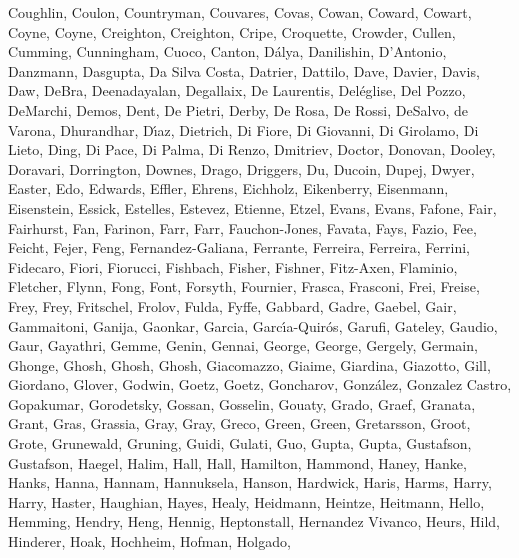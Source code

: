 \documentclass[times,tight]{aastex631}
\begin{document}
\begin{thebibliography}{}
{  {Coughlin}, {Coulon}, {Countryman}, {Couvares}, {Covas}, {Cowan}, {Coward},
  {Cowart}, {Coyne}, {Coyne}, {Creighton}, {Creighton}, {Cripe}, {Croquette},
  {Crowder}, {Cullen}, {Cumming}, {Cunningham}, {Cuoco}, {Canton}, {D{\'a}lya},
  {Danilishin}, {D'Antonio}, {Danzmann}, {Dasgupta}, {Da Silva Costa},
  {Datrier}, {Dattilo}, {Dave}, {Davier}, {Davis}, {Daw}, {DeBra},
  {Deenadayalan}, {Degallaix}, {De Laurentis}, {Del{\'e}glise}, {Del Pozzo},
  {DeMarchi}, {Demos}, {Dent}, {De Pietri}, {Derby}, {De Rosa}, {De Rossi},
  {DeSalvo}, {de Varona}, {Dhurandhar}, {D{\'\i}az}, {Dietrich}, {Di Fiore},
  {Di Giovanni}, {Di Girolamo}, {Di Lieto}, {Ding}, {Di Pace}, {Di Palma}, {Di
  Renzo}, {Dmitriev}, {Doctor}, {Donovan}, {Dooley}, {Doravari}, {Dorrington},
  {Downes}, {Drago}, {Driggers}, {Du}, {Ducoin}, {Dupej}, {Dwyer}, {Easter},
  {Edo}, {Edwards}, {Effler}, {Ehrens}, {Eichholz}, {Eikenberry}, {Eisenmann},
  {Eisenstein}, {Essick}, {Estelles}, {Estevez}, {Etienne}, {Etzel}, {Evans},
  {Evans}, {Fafone}, {Fair}, {Fairhurst}, {Fan}, {Farinon}, {Farr}, {Farr},
  {Fauchon-Jones}, {Favata}, {Fays}, {Fazio}, {Fee}, {Feicht}, {Fejer}, {Feng},
  {Fernandez-Galiana}, {Ferrante}, {Ferreira}, {Ferreira}, {Ferrini},
  {Fidecaro}, {Fiori}, {Fiorucci}, {Fishbach}, {Fisher}, {Fishner},
  {Fitz-Axen}, {Flaminio}, {Fletcher}, {Flynn}, {Fong}, {Font}, {Forsyth},
  {Fournier}, {Frasca}, {Frasconi}, {Frei}, {Freise}, {Frey}, {Frey},
  {Fritschel}, {Frolov}, {Fulda}, {Fyffe}, {Gabbard}, {Gadre}, {Gaebel},
  {Gair}, {Gammaitoni}, {Ganija}, {Gaonkar}, {Garcia},
  {Garc{\'\i}a-Quir{\'o}s}, {Garufi}, {Gateley}, {Gaudio}, {Gaur}, {Gayathri},
  {Gemme}, {Genin}, {Gennai}, {George}, {George}, {Gergely}, {Germain},
  {Ghonge}, {Ghosh}, {Ghosh}, {Ghosh}, {Giacomazzo}, {Giaime}, {Giardina},
  {Giazotto}, {Gill}, {Giordano}, {Glover}, {Godwin}, {Goetz}, {Goetz},
  {Goncharov}, {Gonz{\'a}lez}, {Gonzalez Castro}, {Gopakumar}, {Gorodetsky},
  {Gossan}, {Gosselin}, {Gouaty}, {Grado}, {Graef}, {Granata}, {Grant}, {Gras},
  {Grassia}, {Gray}, {Gray}, {Greco}, {Green}, {Green}, {Gretarsson}, {Groot},
  {Grote}, {Grunewald}, {Gruning}, {Guidi}, {Gulati}, {Guo}, {Gupta}, {Gupta},
  {Gustafson}, {Gustafson}, {Haegel}, {Halim}, {Hall}, {Hall}, {Hamilton},
  {Hammond}, {Haney}, {Hanke}, {Hanks}, {Hanna}, {Hannam}, {Hannuksela},
  {Hanson}, {Hardwick}, {Haris}, {Harms}, {Harry}, {Harry}, {Haster},
  {Haughian}, {Hayes}, {Healy}, {Heidmann}, {Heintze}, {Heitmann}, {Hello},
  {Hemming}, {Hendry}, {Heng}, {Hennig}, {Heptonstall}, {Hernandez Vivanco},
  {Heurs}, {Hild}, {Hinderer}, {Hoak}, {Hochheim}, {Hofman}, {Holgado},
}
\end{thebibliography}
\end{document}
